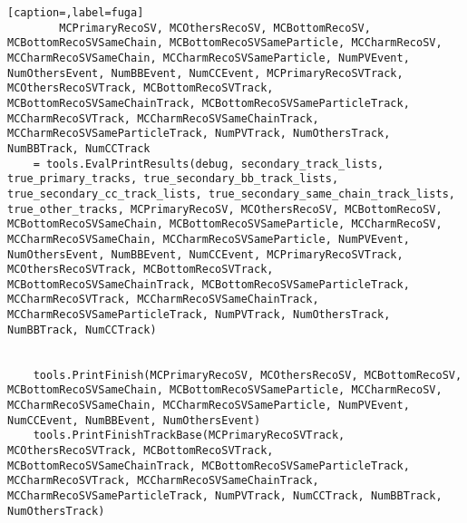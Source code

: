 \begin{lstlisting}[caption=,label=fuga]
        MCPrimaryRecoSV, MCOthersRecoSV, MCBottomRecoSV, MCBottomRecoSVSameChain, MCBottomRecoSVSameParticle, MCCharmRecoSV, MCCharmRecoSVSameChain, MCCharmRecoSVSameParticle, NumPVEvent, NumOthersEvent, NumBBEvent, NumCCEvent, MCPrimaryRecoSVTrack, MCOthersRecoSVTrack, MCBottomRecoSVTrack, MCBottomRecoSVSameChainTrack, MCBottomRecoSVSameParticleTrack, MCCharmRecoSVTrack, MCCharmRecoSVSameChainTrack, MCCharmRecoSVSameParticleTrack, NumPVTrack, NumOthersTrack, NumBBTrack, NumCCTrack
	= tools.EvalPrintResults(debug, secondary_track_lists, true_primary_tracks, true_secondary_bb_track_lists, true_secondary_cc_track_lists, true_secondary_same_chain_track_lists, true_other_tracks, MCPrimaryRecoSV, MCOthersRecoSV, MCBottomRecoSV, MCBottomRecoSVSameChain, MCBottomRecoSVSameParticle, MCCharmRecoSV, MCCharmRecoSVSameChain, MCCharmRecoSVSameParticle, NumPVEvent, NumOthersEvent, NumBBEvent, NumCCEvent, MCPrimaryRecoSVTrack, MCOthersRecoSVTrack, MCBottomRecoSVTrack, MCBottomRecoSVSameChainTrack, MCBottomRecoSVSameParticleTrack, MCCharmRecoSVTrack, MCCharmRecoSVSameChainTrack, MCCharmRecoSVSameParticleTrack, NumPVTrack, NumOthersTrack, NumBBTrack, NumCCTrack)


    tools.PrintFinish(MCPrimaryRecoSV, MCOthersRecoSV, MCBottomRecoSV, MCBottomRecoSVSameChain, MCBottomRecoSVSameParticle, MCCharmRecoSV, MCCharmRecoSVSameChain, MCCharmRecoSVSameParticle, NumPVEvent, NumCCEvent, NumBBEvent, NumOthersEvent)
    tools.PrintFinishTrackBase(MCPrimaryRecoSVTrack, MCOthersRecoSVTrack, MCBottomRecoSVTrack, MCBottomRecoSVSameChainTrack, MCBottomRecoSVSameParticleTrack, MCCharmRecoSVTrack, MCCharmRecoSVSameChainTrack, MCCharmRecoSVSameParticleTrack, NumPVTrack, NumCCTrack, NumBBTrack, NumOthersTrack)
\end{lstlisting}
    
    
    
    
    
    
    
    
    
    
    
    
    
    